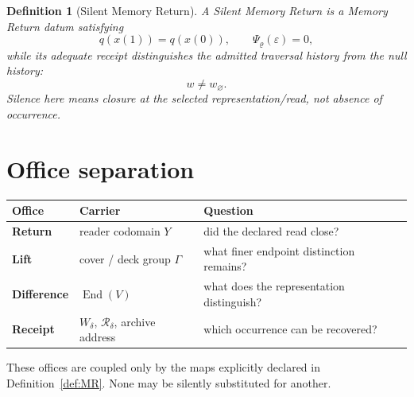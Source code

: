 \documentclass[11pt]{article}
\newtheorem{definition}[theorem]{Definition}
\begin{document}
\begin{definition}[Silent Memory Return]
A Silent Memory Return is a Memory Return datum satisfying
\[
q(x(1))=q(x(0)),
\qquad
\Psi_{\varrho}(\varepsilon)=0,
\]
while its adequate receipt distinguishes the admitted traversal history from the null history:
\[
w\neq w_{\varnothing}.
\]
Silence here means closure at the selected representation/read, not absence of occurrence.
\end{definition}

\section{Office separation}
\small
\begin{tabularx}{\textwidth}{@{}>{\bfseries}p{0.95in}p{1.85in}X@{}}
\toprule
Office & Carrier & Question\\
\midrule
Return & reader codomain $Y$ & did the declared read close?\\
Lift & cover / deck group $\Gamma$ & what finer endpoint distinction remains?\\
Difference & $\operatorname{End}(V)$ & what does the representation distinguish?\\
Receipt & $W_\delta$, $\mathcal R_\delta$, archive address & which occurrence can be recovered?\\
\bottomrule
\end{tabularx}
\normalsize

These offices are coupled only by the maps explicitly declared in Definition~\ref{def:MR}. None may be silently substituted for another.
\end{document}
